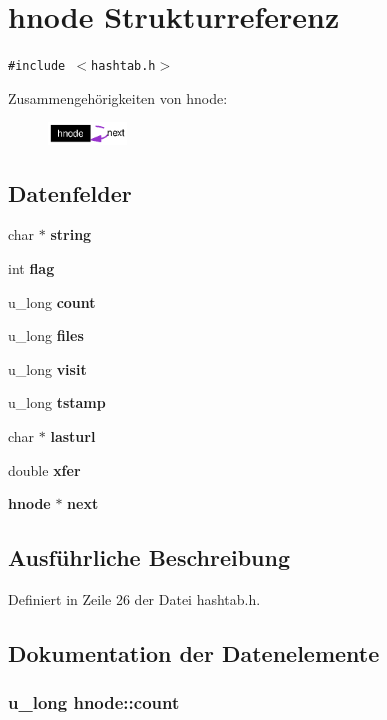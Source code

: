 \section{hnode Strukturreferenz}
\label{structhnode}
{\tt \#include $<$hashtab.h$>$}

Zusammengeh\"{o}rigkeiten von hnode:\begin{figure}[H]
\begin{center}
\leavevmode
\includegraphics[width=59pt]{structhnode__coll__graph}
\end{center}
\end{figure}
\subsection*{Datenfelder}
\begin{CompactItemize}
\item 
char $\ast$ {\bf string}
\item 
int {\bf flag}
\item 
u\_\-long {\bf count}
\item 
u\_\-long {\bf files}
\item 
u\_\-long {\bf visit}
\item 
u\_\-long {\bf tstamp}
\item 
char $\ast$ {\bf lasturl}
\item 
double {\bf xfer}
\item 
{\bf hnode} $\ast$ {\bf next}
\end{CompactItemize}


\subsection{Ausf\"{u}hrliche Beschreibung}




Definiert in Zeile 26 der Datei hashtab.h.

\subsection{Dokumentation der Datenelemente}
\subsubsection{\setlength{\rightskip}{0pt plus 5cm}u\_\-long {\bf hnode::count}}\label{structhnode_ea12ded28f814b621ae07ab94aaa1f4e}




